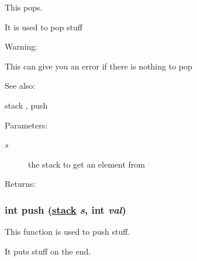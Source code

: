 This pops.

It is used to pop stuff

\begin{Desc}
\item[Warning: ]\par
This can give you an error if there is nothing to pop \end{Desc}
\begin{Desc}
\item[See also: ]\par
stack , push \end{Desc}
\begin{Desc}
\item[Parameters: ]\par
\begin{description}
\item[{\em 
s}]the stack to get an element from\end{description}
\end{Desc}
\begin{Desc}
\item[Returns: ]\par
\end{Desc}
\hypertarget{group__stack_a0}{
\subsubsection[push]{\setlength{\rightskip}{0pt plus 5cm}int push (\hyperlink{structstack}{stack} {\em s}, int {\em val})}}
\label{group__stack_a0}


This function is used to push stuff.

It puts stuff on the end.

